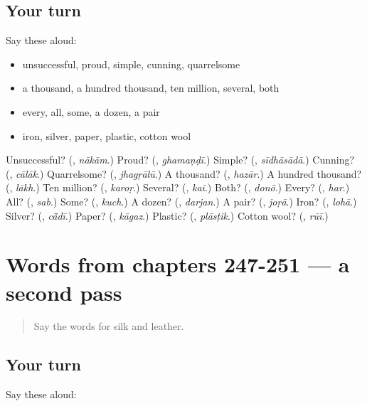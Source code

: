 \subsection*{Your turn}
Say these aloud:

\begin{itemize}
\raggedright
  \item unsuccessful, proud, simple, cunning, quarrelsome
  \item a thousand, a hundred thousand, ten million, several, both
  \item every, all, some, a dozen, a pair
  \item iron, silver, paper, plastic, cotton wool
\end{itemize}

\begin{tcolorbox}[breakable,colback=teal!4,colframe=teal!35!black,title={Before you move on}]
Unsuccessful? (\textbf{}, \emph{nākām}.) Proud? (\textbf{}, \emph{ghamaṇḍī}.) Simple? (\textbf{}, \emph{sīdhāsādā}.) Cunning? (\textbf{}, \emph{cālāk}.) Quarrelsome? (\textbf{}, \emph{jhagṛālū}.) A thousand? (\textbf{}, \emph{hazār}.) A hundred thousand? (\textbf{}, \emph{lākh}.) Ten million? (\textbf{}, \emph{karoṛ}.) Several? (\textbf{}, \emph{kaī}.) Both? (\textbf{}, \emph{donõ}.) Every? (\textbf{}, \emph{har}.) All? (\textbf{}, \emph{sab}.) Some? (\textbf{}, \emph{kuch}.) A dozen? (\textbf{}, \emph{darjan}.) A pair? (\textbf{}, \emph{joṛā}.) Iron? (\textbf{}, \emph{lohā}.) Silver? (\textbf{}, \emph{cā̃dī}.) Paper? (\textbf{}, \emph{kāgaz}.) Plastic? (\textbf{}, \emph{plāsṭik}.) Cotton wool? (\textbf{}, \emph{rūī}.)
\end{tcolorbox}
\section[(dialogue)]{Words from chapters 247-251 — a second pass}

\label{lesson:HI-R251-second-pass-words-from-chapters-247-251}



\begin{quote}
Say the words for silk and leather.
\end{quote}

\subsection*{Your turn}
Say these aloud:

